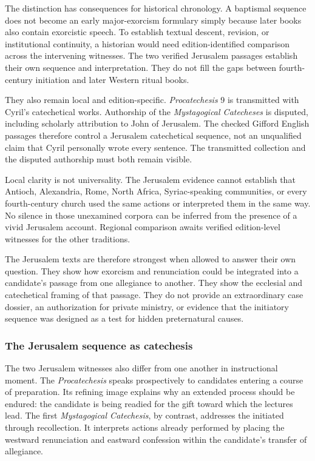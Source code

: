 The distinction has consequences for historical chronology. A baptismal
sequence does not become an early major-exorcism formulary simply because
later books also contain exorcistic speech. To establish textual descent,
revision, or institutional continuity, a historian would need
edition-identified comparison across the intervening witnesses. The two
verified Jerusalem passages establish their own sequence and interpretation.
They do not fill the gaps between fourth-century initiation and later Western
ritual books.

They also remain local and edition-specific. \emph{Procatechesis} 9 is
transmitted with Cyril's catechetical works. Authorship of the
\emph{Mystagogical Catecheses} is disputed, including scholarly attribution
to John of Jerusalem. The checked Gifford English passages therefore control
a Jerusalem catechetical sequence, not an unqualified claim that Cyril
personally wrote every sentence. The transmitted collection and the disputed
authorship must both remain visible.

Local clarity is not universality. The Jerusalem evidence cannot establish
that Antioch, Alexandria, Rome, North Africa, Syriac-speaking communities, or
every fourth-century church used the same actions or interpreted them in the
same way. No silence in those unexamined corpora can be inferred from the
presence of a vivid Jerusalem account. Regional comparison awaits verified
edition-level witnesses for the other traditions.

The Jerusalem texts are therefore strongest when allowed to answer their own
question. They show how exorcism and renunciation could be integrated into a
candidate's passage from one allegiance to another. They show the ecclesial
and catechetical framing of that passage. They do not provide an extraordinary
case dossier, an authorization for private ministry, or evidence that the
initiatory sequence was designed as a test for hidden preternatural causes.

\subsubsection{The Jerusalem sequence as catechesis}

The two Jerusalem witnesses also differ from one another in instructional
moment. The \emph{Procatechesis} speaks prospectively to candidates entering a
course of preparation. Its refining image explains why an extended process
should be endured: the candidate is being readied for the gift toward which
the lectures lead. The first \emph{Mystagogical Catechesis}, by contrast,
addresses the initiated through recollection. It interprets actions already
performed by placing the westward renunciation and eastward confession within
the candidate's transfer of allegiance.

